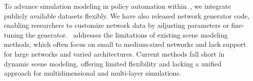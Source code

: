 


To advance simulation modeling in policy automation within~\modelcla, we integrate publicly available datasets flexibly. We have also released network generator code, enabling researchers to customize network data by adjusting parameters or fine-tuning the generator. \modelsim~addresses the limitations of existing scene modeling methods, which often focus on small to medium-sized networks and lack support for large networks and varied architectures. Current methods fall short in dynamic scene modeling, offering limited flexibility and lacking a unified approach for multidimensional and multi-layer simulations.


